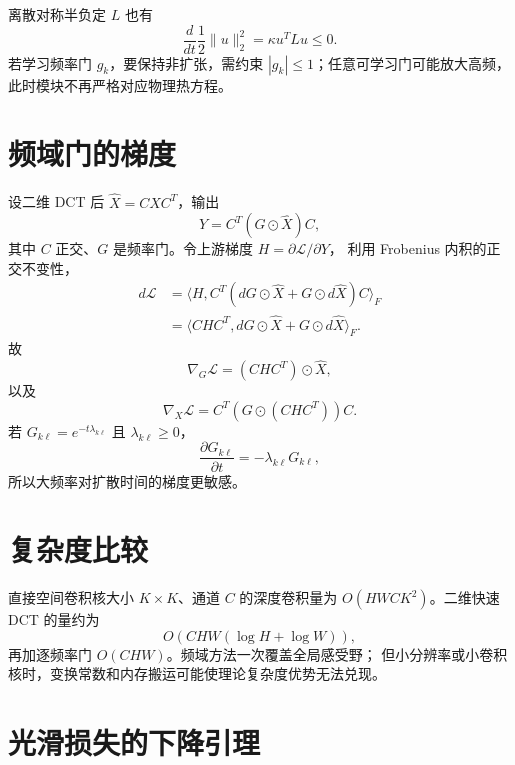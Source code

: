 \documentclass[11pt]{article}
\numberwithin{equation}{section}
\newcommand{\1}{\mathbf{1}}
\newcommand{\cL}{\mathcal{L}}
\begin{document}
离散对称半负定 $L$ 也有
\begin{equation}
 \frac d{dt}\frac12\|u\|_2^2
 =\kappa u^TLu\le0.
\end{equation}
若学习频率门 $g_k$，要保持非扩张，需约束 $|g_k|\le1$；任意可学习门可能放大高频，
此时模块不再严格对应物理热方程。

\section{频域门的梯度}

设二维 DCT 后 $\widehat X=CXC^T$，输出
\begin{equation}
 Y=C^T(G\odot\widehat X)C,
\end{equation}
其中 $C$ 正交、$G$ 是频率门。令上游梯度 $H=\partial\cL/\partial Y$，
利用 Frobenius 内积的正交不变性，
\begin{align}
 d\cL
 &=\langle H,C^T(dG\odot\widehat X+G\odot d\widehat X)C\rangle_F\\
 &=\langle CHC^T, dG\odot\widehat X+G\odot d\widehat X\rangle_F.
\end{align}
故
\begin{equation}
 \nabla_G\cL=(CHC^T)\odot\widehat X,
\end{equation}
以及
\begin{equation}
 \nabla_X\cL=C^T\left(G\odot(CHC^T)\right)C.
\end{equation}
若 $G_{k\ell}=e^{-t\lambda_{k\ell}}$ 且 $\lambda_{k\ell}\ge0$，
\begin{equation}
 \frac{\partial G_{k\ell}}{\partial t}=-\lambda_{k\ell}G_{k\ell},
\end{equation}
所以大频率对扩散时间的梯度更敏感。

\section{复杂度比较}

直接空间卷积核大小 $K\times K$、通道 $C$ 的深度卷积量为
$O(HWCK^2)$。二维快速 DCT 的量约为
\begin{equation}
 O(CHW(\log H+\log W)),
\end{equation}
再加逐频率门 $O(CHW)$。频域方法一次覆盖全局感受野；
但小分辨率或小卷积核时，变换常数和内存搬运可能使理论复杂度优势无法兑现。

\section{光滑损失的下降引理}
\end{document}
